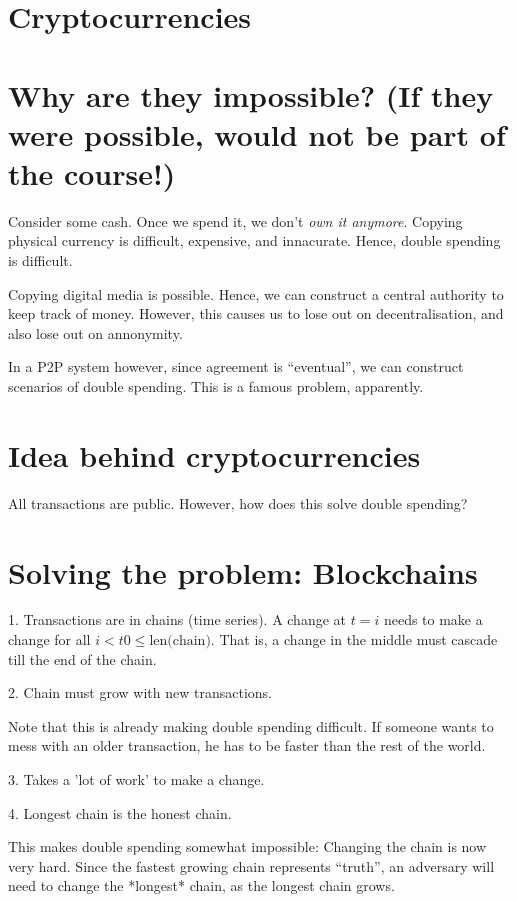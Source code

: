 \documentclass[11pt]{article}
\begin{document}
\section{Cryptocurrencies}

\section{Why are they impossible? (If they were possible, would not be part of the course!)}

Consider some cash. Once we spend it, we don't \textit{own it anymore}.
Copying physical currency is difficult, expensive, and innacurate.
Hence, double spending is difficult.

Copying digital media is possible. Hence, we can construct a central authority to keep
track of money. However, this causes us to lose out on decentralisation, and also lose out on
annonymity.


In a P2P system however, since agreement is ``eventual'', we can construct scenarios of
double spending. This is a famous problem, apparently. 


\section{Idea behind cryptocurrencies}

All transactions are public. However, how does this solve double spending?

\section{Solving the problem: Blockchains}

1. Transactions are in chains (time series). A change at $t=i$ needs to make a change
for all $i < t0 \leq \text{len(chain)}$. That is, a change in the middle must cascade
till the end of the chain.

2. Chain must grow with new transactions.

Note that this is already making double spending difficult. If someone wants to mess with an older
transaction, he has to be faster than the rest of the world.

3. Takes a 'lot of work' to make a change.

4. Longest chain is the honest chain.

This makes double spending somewhat impossible: Changing the chain is now very hard. Since the fastest growing
chain represents ``truth'', an adversary will need to change the *longest* chain, as the longest chain grows.
\end{document}
